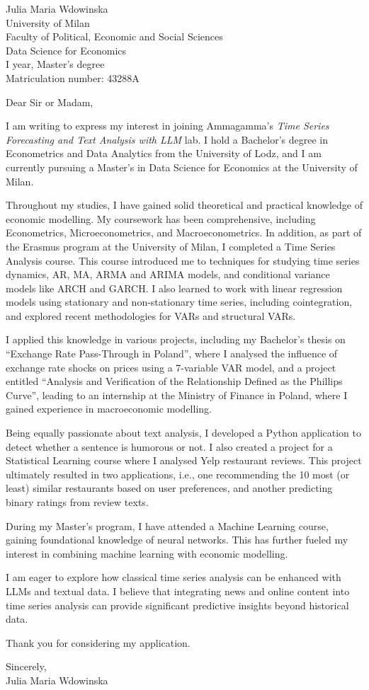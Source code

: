 \documentclass{letter}
\begin{document}
\begin{letter}{Julia Maria Wdowinska \\
University of Milan \\
Faculty of Political, Economic and Social Sciences \\
Data Science for Economics \\
I year, Master’s degree \\
Matriculation number: 43288A}

\opening{Dear Sir or Madam,}

I am writing to express my interest in joining Ammagamma's \textit{Time Series Forecasting and Text Analysis with LLM} lab. I hold a Bachelor's degree in Econometrics and Data Analytics from the University of Lodz, and I am currently pursuing a Master's in Data Science for Economics at the University of Milan.

Throughout my studies, I have gained solid theoretical and practical knowledge of economic modelling. My coursework has been comprehensive, including Econometrics, Microeconometrics, and Macroeconometrics. In addition, as part of the Erasmus program at the University of Milan, I completed a Time Series Analysis course. This course introduced me to techniques for studying time series dynamics, AR, MA, ARMA and ARIMA models, and conditional variance models like ARCH and GARCH. I also learned to work with linear regression models using stationary and non-stationary time series, including cointegration, and explored recent methodologies for VARs and structural VARs.

I applied this knowledge in various projects, including my Bachelor's thesis on ``Exchange Rate Pass-Through in Poland'', where I analysed the influence of exchange rate shocks on prices using a 7-variable VAR model, and a project entitled ``Analysis and Verification of the Relationship Defined as the Phillips Curve'', leading to an internship at the Ministry of Finance in Poland, where I gained experience in macroeconomic modelling.

Being equally passionate about text analysis, I developed a Python application to detect whether a sentence is humorous or not. I also created a project for a Statistical Learning course where I analysed Yelp restaurant reviews. This project ultimately resulted in two applications, i.e., one recommending the 10 most (or least) similar restaurants based on user preferences, and another predicting binary ratings from review texts.

During my Master's program, I have attended a Machine Learning course, gaining foundational knowledge of neural networks. This has further fueled my interest in combining machine learning with economic modelling.

I am eager to explore how classical time series analysis can be enhanced with LLMs and textual data. I believe that integrating news and online content into time series analysis can provide significant predictive insights beyond historical data.

Thank you for considering my application.

\closing{Sincerely, \\ Julia Maria Wdowinska}

\end{letter}
\end{document}

